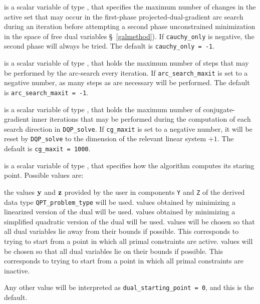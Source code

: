 \begin{description}
 is a scalar variable of type \integer, that specifies
the maximum number of changes in the active set that may occur in the
first-phase projected-dual-gradient arc search during an iteration before
attempting a second phase unconstrained minimization in the space of
free dual variables \S~\ref{galmethod}). If {\tt cauchy\_only} is negative,
the second phase will always be tried.
The default is {\tt cauchy\_only = -1}.

 is a scalar variable of type \integer,
that holds the maximum number of steps that may be performed
by the arc-search every iteration.
If {\tt arc\_search\_maxit} is set to a negative number, as many steps
as are necessary will be performed.
The default is {\tt arc\_search\_maxit = -1}.

 is a scalar variable of type \integer, that holds the
maximum number of conjugate-gradient inner iterations that may be performed
during the computation of each search direction in {\tt DQP\_solve}.
If {\tt cg\_maxit} is set to a negative number, it will be reset by
{\tt DQP\_solve} to the dimension of the relevant linear system $+ 1$.
The default is {\tt cg\_maxit = 1000}.

 is a scalar variable of type \integer, that
specifies how the algorithm computes its staring point.
Possible values are:
\begin{description}
 the values ${\mathbf{y}}$ and ${\mathbf{z}}$
        provided by the user in components {\tt Y} and {\tt Z}
        of the derived data type {\tt QPT\_problem\_type} will be used.
 values obtained by minimizing a linearized version of the dual
        will be used.
 values obtained by minimizing a simplified quadratic version of
        the dual will be used.
 values will be chosen so that all dual variables lie away from
        their bounds if possible. This corresponds to trying to start
        from a point in which all primal constraints are active.
 values will be chosen so that all dual variables lie on
        their bounds if possible. This corresponds to trying to start
        from a point in which all primal constraints are inactive.
\end{description}
Any other value will be interpreted as {\tt dual\_starting\_point = 0},
and this is the default.



\end{description}
